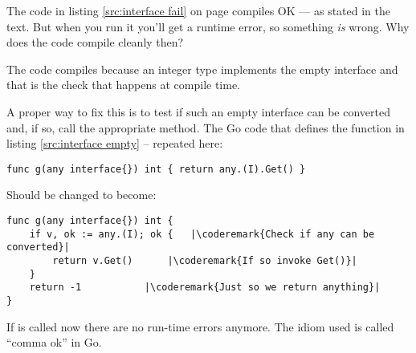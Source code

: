 \begin{Exercise}[title={Interfaces and compilation},difficulty=1]
\Question
The code in listing \ref{src:interface fail} on page
\pageref{src:interface fail} compiles OK --- as stated 
in the text. But when you run it you'll get a runtime error, so
something \emph{is} wrong. Why does the code compile cleanly then?
\end{Exercise}

\begin{Answer}
\Question
The code compiles because an integer type implements the empty interface
and that is the check that happens at compile time.

A proper way to fix this is to test if such an empty interface can
be converted and, if so, call the appropriate method. The Go code
that defines the function  in listing \ref{src:interface empty}
-- repeated here:
\begin{lstlisting}
func g(any interface{}) int { return any.(I).Get() }
\end{lstlisting}

\noindent{}Should be changed to become:
\begin{lstlisting}
func g(any interface{}) int {
    if v, ok := any.(I); ok {	|\coderemark{Check if any can be converted}|
        return v.Get()		|\coderemark{If so invoke Get()}|
    }
    return -1			|\coderemark{Just so we return anything}|
}
\end{lstlisting}
If  is called now there are no run-time errors anymore. The
idiom used is called ``comma ok'' in Go.
\end{Answer}
